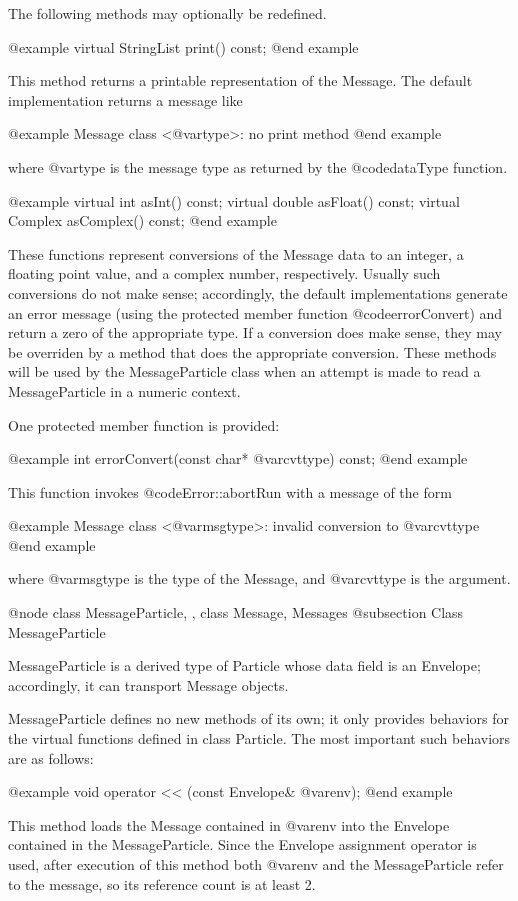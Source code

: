 The following methods may optionally be redefined.

@example
virtual StringList print() const;
@end example

This method returns a printable representation of the Message.
The default implementation returns a message like

@example
Message class <@var{type}>: no print method
@end example

where @var{type} is the message type as returned by the @code{dataType}
function.

@example
virtual int asInt() const;
virtual double asFloat() const;
virtual Complex asComplex() const;
@end example

These functions represent conversions of the Message data to an integer,
a floating point value, and a complex number, respectively.  Usually
such conversions do not make sense; accordingly, the default
implementations generate an error message (using the protected member
function @code{errorConvert}) and return a zero of the appropriate type.
If a conversion does make sense, they may be overriden by a method that
does the appropriate conversion.  These methods will be used by the
MessageParticle class when an attempt is made to read a MessageParticle
in a numeric context.

One protected member function is provided:

@example
int errorConvert(const char* @var{cvttype}) const;
@end example

This function invokes @code{Error::abortRun} with a message of the
form

@example
Message class <@var{msgtype}>: invalid conversion to @var{cvttype}
@end example

where @var{msgtype} is the type of the Message, and @var{cvttype} is
the argument.

@node class MessageParticle,  , class Message, Messages
@subsection Class MessageParticle

MessageParticle is a derived type of Particle whose data field is an
Envelope; accordingly, it can transport Message objects.

MessageParticle defines no new methods of its own; it only provides
behaviors for the virtual functions defined in class Particle.
The most important such behaviors are as follows:

@example
void operator << (const Envelope& @var{env});
@end example

This method loads the Message contained in @var{env} into the Envelope
contained in the MessageParticle.  Since the Envelope assignment
operator is used, after execution of this method both @var{env} and
the MessageParticle refer to the message, so its reference count is at
least 2.

